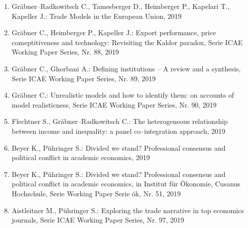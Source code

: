 \begin{enumerate}
	 \item Gräbner--Radkowitsch C., Tamesberger D., Heimberger P., Kapelari T., Kapeller J.: Trade Models in the European Union, 2019
	 \item Gräbner C., Heimberger P., Kapeller J.: Export performance, price comeptitiveness and technology: Revisiting the Kaldor paradox, Serie ICAE Working Paper Series, Nr. 88, 2019
	 \item Gräbner C., Ghorbani A.: Defining institutions -- A review and a synthesis, Serie ICAE Working Paper Series, Nr. 89, 2019
	 \item Gräbner C.: Unrealistic models and how to identify them: on accounts of model realisticness, Serie ICAE Working Paper Series, Nr. 90, 2019
	 \item Flechtner S., Gräbner--Radkowitsch C.: The heterogeneous relationship between income and inequality: a panel co--integration approach, 2019
	 \item Beyer K., Pühringer S.: Divided we stand? Professional consensus and political conflict in academic economics, 2019
	 \item Beyer K., Pühringer S.: Divided we stand? Professional consensus and political conflict in academic economics, in Institut für Ökonomie, Cusanus Hochschule, Serie Working Paper Serie ök, Nr. 51, 2019
	 \item Aistleitner M., Pühringer S.: Exploring the trade narrative in top economics journals, Serie ICAE Working Paper Series, Nr. 97, 2019
\end{enumerate}
